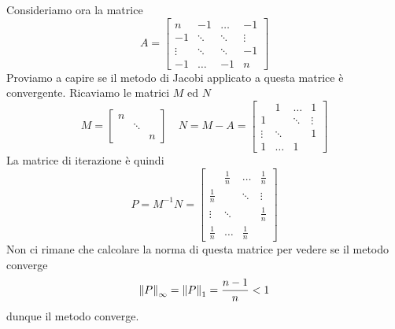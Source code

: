 \begin{example}
	Consideriamo ora la matrice
	\[
		A = \begin{bmatrix}
			n      & -1     & \dots  & -1     \\
			-1     & \ddots & \ddots & \vdots \\
			\vdots & \ddots & \ddots & -1     \\
			-1     & \dots  & -1     & n
		\end{bmatrix}
	\]
	Proviamo a capire se il metodo di Jacobi applicato a questa matrice è convergente. Ricaviamo le matrici $M$
	ed $N$
	\[
		M = \begin{bmatrix}
			n &        &   \\
			  & \ddots &   \\
			  &        & n
		\end{bmatrix} \quad
		N = M - A = \begin{bmatrix}
			       & 1      & \dots  & 1      \\
			1      &        & \ddots & \vdots \\
			\vdots & \ddots &        & 1      \\
			1      & \dots  & 1      &
		\end{bmatrix}
	\]
	La matrice di iterazione è quindi
	\[
		P = M^{-1} N = \begin{bmatrix}
			            & \frac{1}{n} & \dots       & \frac{1}{n} \\
			\frac{1}{n} &             & \ddots      & \vdots      \\
			\vdots      & \ddots      &             & \frac{1}{n} \\
			\frac{1}{n} & \dots       & \frac{1}{n} &
		\end{bmatrix}
	\]
	Non ci rimane che calcolare la norma di questa matrice per vedere se il metodo converge
	\[ \left\lVert P\right\rVert_\infty = \left\lVert P\right\rVert_1 = \frac{n-1}{n} < 1 \]
	dunque il metodo converge.


\end{example}
